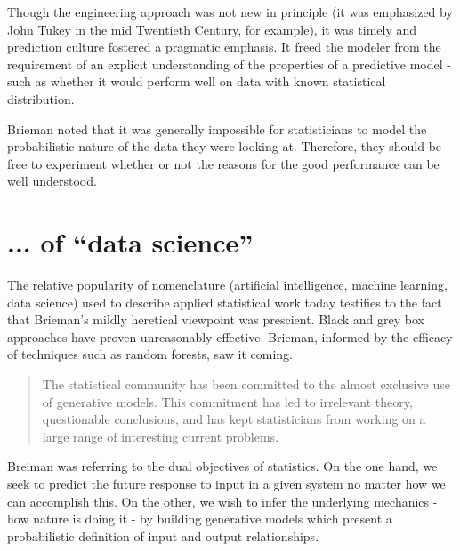 Though the engineering approach was not new in principle (it was emphasized by John Tukey in the mid Twentieth Century, for example), it was timely and prediction culture fostered a pragmatic emphasis. It freed the modeler from the requirement of an explicit understanding of the properties of a predictive model - such as whether it would perform well on data with known statistical distribution.

Brieman noted that it was generally impossible for statisticians to model the probabilistic nature of the data they were looking at. Therefore, they should be free to experiment whether or not the reasons for the good performance can be well understood.

\section{... of ``data science''}

The relative popularity of nomenclature (artificial intelligence, machine learning, data science) used to describe applied statistical work today testifies to the fact that Brieman's mildly heretical viewpoint was prescient. Black and grey box approaches have proven unreasonably effective. Brieman, informed by the efficacy of techniques such as random forests, saw it coming.
    \begin{quote}{\cite{Breiman2001StatisticalCultures}}
  The statistical community has been committed to the almost exclusive use of generative
models. This commitment has led to irrelevant theory, questionable conclusions,
and has kept statisticians from working on a large range of interesting current problems.
\end{quote}

Breiman was referring to the dual objectives of statistics. On the one hand, we seek to predict the future response to input in a given system no matter how we can accomplish this. On the other, we wish to infer the underlying mechanics - how nature is doing it - by building generative models which present a probabilistic definition of input and output relationships.  

